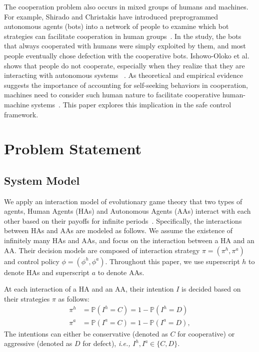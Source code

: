 \documentclass[letterpaper]{article} %
\newcommand{\ie}{\textit{i.e., }}
\begin{document}
The cooperation problem also occurs in mixed groups of humans and machines. For example, Shirado and Christakis have introduced preprogrammed autonomous agents (bots) into a network of people to examine which bot strategies can facilitate cooperation in human groups~\cite{Shirado2020-hs}. In the study, the bots that always cooperated with humans were simply exploited by them, and most people eventually chose defection with the cooperative bots. Ishowo-Oloko et al. shows that people do not cooperate, especially when they realize that they are interacting with autonomous systems ~\cite{Ishowo-Oloko2019-vn}. As theoretical and empirical evidence suggests the importance of accounting for self-seeking behaviors in cooperation, machines need to consider such human nature to facilitate cooperative human-machine systems~\cite{Paiva2018-iu, Dafoe2021-cw,Rahwan2019-rk}. This paper explores this implication in the safe control framework.


\section{Problem Statement}
\label{sec:ps}
\subsection{System Model}
We apply an interaction model of evolutionary game theory that two types of agents, Human Agents (HAs) and Autonomous Agents (AAs) interact with each other based on their payoffs for infinite periods~\cite{Hofbauer1998-jg, Nowak2006-bl}. Specifically, the interactions between HAs and AAs are modeled as follows. We assume the existence of infinitely many HAs and AAs, and focus on the interaction between a HA and an AA.  Their decision models are composed of interaction strategy $\pi=(\pi^h,\pi^a)$ and control policy $\phi = (\phi^h, \phi^a)$.  Throughout this paper, we use superscript $h$ to denote HAs and superscript $a$ to denote AAs. 

At each interaction of a HA and an AA, their intention $I$ is decided based on their strategies $\pi$ as follows:
\begin{align}
\label{eq:strategy}
    \pi^h &= \mathbb{P}(I^h=C)=1-\mathbb{P}(I^h=D) \\
    \pi^a &= \mathbb{P}(I^a=C)=1-\mathbb{P}(I^a=D),
\end{align}
The intentions can either be conservative (denoted as $C$ for cooperative) or aggressive (denoted as $D$ for defect), \ie $I^h, I^a \in \{C,D\}$. 
\end{document}
